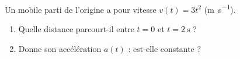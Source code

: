 \documentclass[11pt,a4paper]{article}
\begin{document}
\begin{exo}
Un mobile parti de l'origine a pour vitesse $v(t)=3t^2$ (\si{\metre\per\second}).
\begin{enumerate}[label=\alph*)]
  \item Quelle distance parcourt-il entre $t=0$ et $t=\qty{2}{\second}$ ?
  \item Donne son accélération $a(t)$ : est-elle constante ?
\end{enumerate}
\end{exo}
\end{document}
